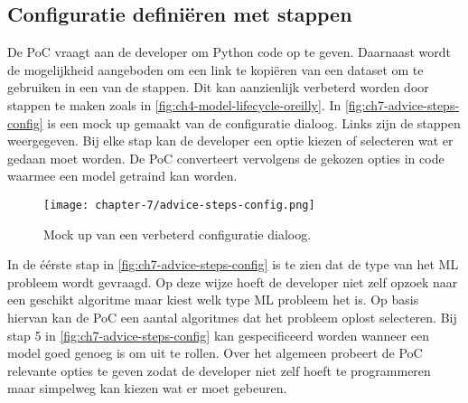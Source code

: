 
\subsection{Configuratie definiëren met stappen}\label{subsec:ch7-configuratie-definieren-met-stappen}
De PoC vraagt aan de developer om Python code op te geven. Daarnaast wordt de mogelijkheid aangeboden om een link te kopiëren van een dataset om te gebruiken in een van de stappen. Dit kan aanzienlijk verbeterd worden door stappen te maken zoals in \autoref{fig:ch4-model-lifecycle-oreilly}. In \autoref{fig:ch7-advice-steps-config} is een mock up gemaakt van de configuratie dialoog. Links zijn de stappen weergegeven. Bij elke stap kan de developer een optie kiezen of selecteren wat er gedaan moet worden. De PoC converteert vervolgens de gekozen opties in code waarmee een model getraind kan worden.

\newpage

\begin{figure}[hbt!]
  \centering
  \texttt{[image: chapter-7/advice-steps-config.png]}
  \caption{Mock up van een verbeterd configuratie dialoog.}
  \label{fig:ch7-advice-steps-config}
\end{figure}

In de éérste stap in \autoref{fig:ch7-advice-steps-config} is te zien dat de type van het ML probleem wordt gevraagd. Op deze wijze hoeft de developer niet zelf opzoek naar een geschikt algoritme maar kiest welk type ML probleem het is. Op basis hiervan kan de PoC een aantal algoritmes dat het probleem oplost selecteren. Bij stap 5 in \autoref{fig:ch7-advice-steps-config} kan gespecificeerd worden wanneer een model goed genoeg is om uit te rollen. Over het algemeen probeert de PoC relevante opties te geven zodat de developer niet zelf hoeft te programmeren maar simpelweg kan kiezen wat er moet gebeuren.